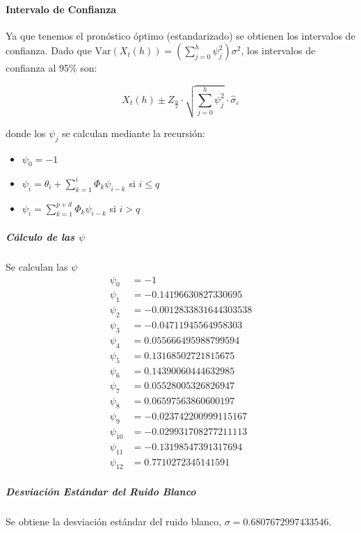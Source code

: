 \documentclass[12pt,letterpaper]{article}   %
\begin{document}
  \paragraph{Intervalo de Confianza}
Ya que tenemos el pronóstico óptimo (estandarizado) se obtienen los intervalos de confianza. Dado que \( \text{Var}(X_t(h)) = \left( \sum_{j=0}^h \psi_j^2 \right) \sigma^2 \), los intervalos de confianza al 95\% son:

\[
X_t(h) \pm Z_{\frac{\alpha}{2}} \cdot \sqrt{ \sum_{j=0}^{h} \psi_j^2 } \cdot \hat{\sigma}_\varepsilon
\]

donde los \( \psi_j \) se calculan mediante la recursión:

\begin{itemize}
    \item \( \psi_0 = -1 \)
    \item \( \psi_i = \theta_i + \sum_{k=1}^{i} \Phi_k \psi_{i-k} \) si \( i \leq q \)
    \item \( \psi_i = \sum_{k=1}^{p+d} \Phi_k \psi_{i-k} \) si \( i > q \)
\end{itemize}

      \subparagraph{Cálculo de las $\psi$}
      Se calculan las $\psi$
      \vspace{-20pt}
    \begin{align*}
\psi_0 &= -1 \\
\psi_1 &= -0.14196630827330695 \\
\psi_2 &= -0.0012833831644303538 \\
\psi_3 &= -0.04711945564958303 \\
\psi_4 &= 0.055666495988799594 \\
\psi_5 &= 0.13168502721815675 \\
\psi_6 &= 0.14390060444632985 \\
\psi_7 &= 0.05528005326826947 \\
\psi_8 &= 0.06597563860600197 \\
\psi_9 &= -0.023742200999115167 \\
\psi_{10} &= -0.029931708277211113 \\
\psi_{11} &= -0.13198547391317694 \\
\psi_{12} &= 0.7710272345141591
\end{align*}




    \subparagraph{Desviación Estándar del Ruido Blanco}
    Se obtiene la desviación estándar del ruido blanco,
$\sigma=0.6807672997433546$.
\end{document}
